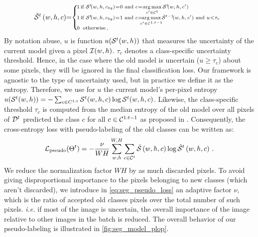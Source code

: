 \begin{equation}
    \scriptsize
    \tilde \mcS^{t}\left(w,h,c\right)\mkern-5mu = \mkern-5mu \left\{\begin{array}{ll}
        \mkern-14mu 1 \mkern-27mu & \mkern-8mu \text { if } \mcS^{t} \mkern-4mu (w,h,c_{bg})\mkern-4mu = \mkern-4mu 0 \text { and } c \mkern-4mu = \mkern-4mu \argmax \limits_{c' \in \mathcal{C}^{t}} \mcS^{t} \mkern-4mu (w,h,c')                                                                         \\
        \mkern-14mu 1 \mkern-27mu & \mkern-8mu \text { if } \mcS^{t} \mkern-4mu (w,h,c_{bg}) \mkern-4mu = \mkern-4mu 1 \text { and } c \mkern-4mu = \mkern-12mu \argmax \limits_{c' \in \mathcal{C}^{1:t-1}} \mkern-6mu \hat \mcS^{t-1} \mkern-4mu (w,h,c') \text{ and } u \mkern-4mu < \mkern-4mu \tau_{c} \\
        \mkern-14mu 0 \mkern-27mu & \mkern-4mu \,\text { otherwise\,, }                                                                                                                                                                                                                                     \\
    \end{array}\right.
    \label{eq:seg_pseudo_bis_uncertain}
\end{equation}
%
By notation abuse, $u$ is function $u(\mathcal{S}^t(w, h))$ that measures the uncertainty of the current
model given a pixel $\mathcal{I}(w,h)$. $\tau_{c}$ denotes a class-specific uncertainty threshold. Hence,
in the case where the old model is uncertain ($u \ge \tau_c$) about some pixels, they will be
ignored in the final classification loss. Our framework is agnostic to the type of uncertainty used,
but in practice we define it as the entropy. Therefore, we use for $u$ the current model's per-pixel
entropy $u(\mathcal{S}^t(w, h)) = -\sum_{c \in C^{1:t}} \mathcal{S}^t(w, h, c) \log \mathcal{S}^t(w, h, c)$. Likewise,
the class-specific threshold $\tau_c$ is computed from the median entropy of the old model over all
pixels of $\mathcal{D}^t$ predicted the class $c$ for all $c \in \mathcal{C}^{1:t-1}$ as proposed in
\cite{saporta2020esl}. Consequently, the cross-entropy loss with pseudo-labeling of the old classes
can be written as:
%
\begin{equation}
    \mathcal{L}_\text{pseudo}(\Theta^t)=- \frac{\nu}{WH} \sum_{w,h}^{W,H} \sum_{c \in \mathcal{C}^{t}} \tilde {\mathcal{S}}\left(w,h,c\right) \log \hat {\mathcal{S}}^{t}\left(w,h,c\right)\,.
    \label{eq:seg_pseudo_loss}
\end{equation}
%
We reduce the normalization factor $WH$ by as much discarded pixels. To avoid giving disproportional
importance to the pixels belonging to new classes (which aren't discarded), we introduce in
\autoref{eq:seg_pseudo_loss} an adaptive factor $\nu$, which is the ratio of accepted old classes
pixels over the total number of such pixels. \textit{i.e.} if most of the image is uncertain, the
overall importance of the image relative to other images in the batch is reduced. The overall
behavior of our pseudo-labeling is illustrated in \autoref{fig:seg_model_plop}.

